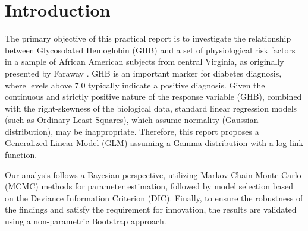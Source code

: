 \section{Introduction}
The primary objective of this practical report is to investigate the relationship between Glycosolated Hemoglobin (GHB) and a set of physiological risk factors in a sample of African American subjects from central Virginia, as originally presented by Faraway \cite{farway2016}. GHB is an important marker for diabetes diagnosis, where levels above 7.0 typically indicate a positive diagnosis. Given the continuous and strictly positive nature of the response variable (GHB), combined with the right-skewness of the biological data, standard linear regression models (such as Ordinary Least Squares), which assume normality (Gaussian distribution), may be inappropriate. Therefore, this report proposes a Generalized Linear Model (GLM) assuming a Gamma distribution with a log-link function.

Our analysis follows a Bayesian perspective, utilizing Markov Chain Monte Carlo (MCMC) methods for parameter estimation, followed by model selection based on the Deviance Information Criterion (DIC). Finally, to ensure the robustness of the findings and satisfy the requirement for innovation, the results are validated using a non-parametric Bootstrap approach.